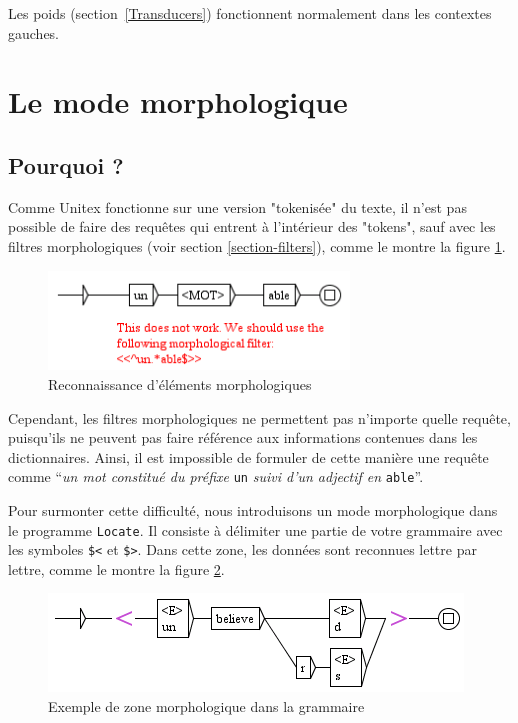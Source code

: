 \bigskip
\noindent Les poids (section~\ref{Transducers}) fonctionnent normalement dans les contextes gauches.

\clearpage

\section{Le mode morphologique}
\label{section-morphological-mode}
\subsection{Pourquoi ?}
Comme Unitex fonctionne sur une version "tokenisée" du texte, il n'est pas possible de
faire des requêtes qui entrent à l'intérieur des "tokens", sauf avec les filtres morphologiques
(voir section \ref{section-filters}), comme le montre la figure
\ref{fig-morpho1}.

\begin{figure}[!ht]
\begin{center}
\includegraphics[width=8cm]{resources/img/fig6-17k.png}
\caption{Reconnaissance d'éléments morphologiques\label{fig-morpho1}}
\end{center}
\end{figure}

\bigskip
\noindent Cependant, les filtres morphologiques ne permettent pas n'importe quelle requête, puisqu'ils ne
peuvent pas faire référence aux informations contenues dans les dictionnaires. Ainsi, il est impossible de formuler de cette 
manière une requête comme ``\textit{un mot constitué du préfixe} \verb$un$ \textit{suivi d'un adjectif en} \verb+able+''.

\bigskip
\noindent Pour surmonter cette difficulté, nous introduisons un mode morphologique dans le programme
\verb$Locate$. Il consiste à délimiter une partie de votre  grammaire avec les 
symboles \verb+$<+ et \verb+$>+.\index{\verb+$<+}\index{\verb+$>+}
Dans cette zone, les données sont reconnues lettre par lettre, comme le montre la figure
\ref{fig-morpho2}.

\begin{figure}[!ht]
\begin{center}
\includegraphics[width=11cm]{resources/img/fig6-17l.png}
\caption{Exemple de zone morphologique dans la grammaire\label{fig-morpho2}}
\end{center}
\end{figure}

